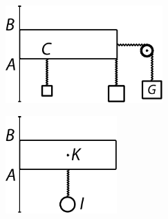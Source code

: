 %
%
\pstart
\begin{minipage}[t]{0.5\textwidth}
\hspace{9mm}\includegraphics[width=0.45\textwidth]{gesamttex/edit_VIII,3/images/dnr-4a_LH_37_03_071-072_d4a.pdf}
\end{minipage}
\hspace{16mm}
\begin{minipage}[t]{0.5\textwidth}
\includegraphics[width=0.32\textwidth]{gesamttex/edit_VIII,3/images/dnr-4b_LH_37_03_071-072_d4b.pdf}
\end{minipage}
